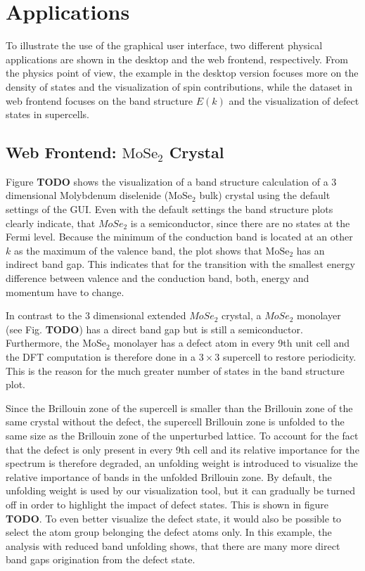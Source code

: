 \chapter{Applications}
\label{chap:applications}


To illustrate the use of the graphical user interface, two different physical
applications are shown in the desktop and the web frontend, respectively. From
the physics point of view, the example in the desktop version focuses more on the
density of states and the visualization of spin contributions, while the dataset
in web frontend focuses on the band structure $E(k)$ and the visualization
of defect states in supercells.

\section{Web Frontend: $\textrm{MoSe}_2$ Crystal}

Figure \textbf{TODO} shows the visualization of a band structure calculation of a 3 dimensional Molybdenum diselenide ($\textrm{MoSe}_2$ bulk) crystal using the default settings of the GUI. Even with the default settings the band structure plots clearly indicate, that $MoSe_2$ is a semiconductor, since there are no states at the Fermi level. Because the minimum of the conduction band is located at an other $k$ as the maximum of the valence band, the plot shows that $\textrm{MoSe}_2$ has an indirect band gap. This indicates that for the transition with the smallest energy difference between valence and the conduction band, both, energy and momentum have to change.

In contrast to the 3 dimensional extended $MoSe_2$ crystal, a $MoSe_2$ monolayer (see Fig. \textbf{TODO}) has a direct band gap but is still a semiconductor. Furthermore, the $\textrm{MoSe}_2$ monolayer has a defect atom in every 9th unit cell and the DFT computation is therefore done in a $3 \times 3$ supercell to restore periodicity. This is the reason for the much greater number of states in the band structure plot. 

Since the Brillouin zone of the supercell is smaller than the Brillouin zone of the same crystal without the defect, the supercell Brillouin zone is unfolded to the same size as the Brillouin zone of the unperturbed lattice. To account for the fact that the defect is only present in every 9th cell and its relative importance for the spectrum is therefore degraded, an unfolding weight is introduced to visualize the relative importance of bands in the unfolded Brillouin zone. By default, the unfolding weight is used by our visualization tool, but it can gradually be turned off in order to highlight the impact of defect states. This is shown in figure \textbf{TODO}. To even better visualize the defect state, it would also be possible to select the atom group belonging the defect atoms only. In this example, the analysis with reduced band unfolding shows, that there are many more direct band gaps origination from the defect state.





